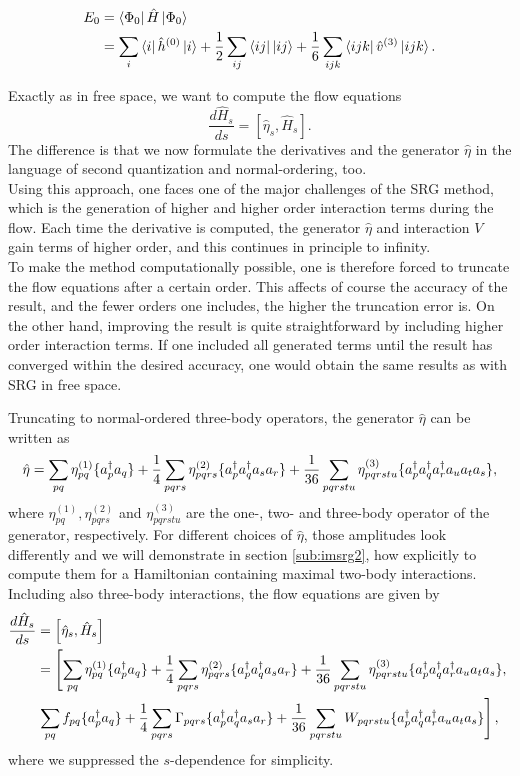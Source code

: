 \begin{align*}
E_0 &= \left\langle \Phi_0 \right| \hat{H} \left| \Phi_0 \right\rangle \\
&= \sum\limits_i \left\langle i \right| \hat{h}^{(0)} \left| i \right\rangle + \frac{1}{2}\sum\limits_{ij}\left\langle ij\right|  \left| ij\right\rangle + \frac{1}{6}\sum\limits_{ijk}\left\langle ijk \right| \hat{v}^{(3)} \left| ijk \right\rangle.
\end{align*}
			
Exactly as in free space, we want to compute the flow equations 
\[
\frac{d \hat{H}_s}{ds} = \left[\hat{\eta}_s, \hat{H}_s \right].
\]
The difference is that we now formulate the derivatives and the generator $\hat{\eta}$ in the language of second quantization and normal-ordering, too. \\
Using this approach, one faces one of the major challenges of the SRG method, which is the generation of higher and higher order interaction terms during the flow. Each time the derivative is computed, the generator $\hat{\eta}$ and interaction $V$ gain terms of higher order, and this continues in principle to infinity.\\
To make the method computationally possible, one is therefore forced to truncate the flow equations after a certain order. This affects of course the accuracy of the result, and the fewer orders one includes, the higher the truncation error is. On the other hand, improving the result is quite straightforward by including higher order interaction terms. If one included all generated terms until the result has converged within the desired accuracy, one would obtain the same results as with SRG in free space.

Truncating to normal-ordered three-body operators, the generator $\hat{\eta}$ can be written as
\[
\hat{\eta} = \sum_{pq} \eta_{pq}^{(1)} \lbrace a_p^\dagger a_q\rbrace + \frac{1}{4}\sum\limits_{pqrs}\eta_{pqrs}^{(2)} \lbrace a_p^\dagger a_q^\dagger a_s a_r \rbrace + \frac{1}{36}\sum\limits_{pqrstu} \eta_{pqrstu}^{(3)} \lbrace a_p^\dagger a_q^\dagger a_r^\dagger a_u a_t a_s\rbrace,
\]
where $\eta_{pq}^{(1)}, \eta_{pqrs}^{(2)}$ and $\eta_{pqrstu}^{(3)}$ are the one-, two- and three-body operator of the generator, respectively. For different choices of $\hat{\eta}$, those amplitudes look differently and we will demonstrate in section \ref{sub:imsrg2}, how explicitly to compute them for a Hamiltonian containing maximal two-body interactions.\\
Including also three-body interactions, the flow equations are given by
\begin{align*}
\frac{d \hat{H}_s}{ds} &= \left[\hat{\eta}_s, \hat{H}_s \right] \\
&= \left [  \sum_{pq} \eta_{pq}^{(1)} \lbrace a_p^\dagger a_q\rbrace + \frac{1}{4}\sum\limits_{pqrs}\eta_{pqrs}^{(2)} \lbrace a_p^\dagger a_q^\dagger a_s a_r \rbrace + \frac{1}{36}\sum\limits_{pqrstu} \eta_{pqrstu}^{(3)} \lbrace a_p^\dagger a_q^\dagger a_r^\dagger a_u a_t a_s\rbrace, \right.\\
& \left.\sum\limits_{pq}f_{pq}\lbrace a_p^\dagger a_q\rbrace + \frac{1}{4}\sum\limits_{pqrs}\Gamma_{pqrs} \lbrace a_p^\dagger a_q^\dagger a_s a_r \rbrace + \frac{1}{36}\sum\limits_{pqrstu} W_{pqrstu} \lbrace a_p^\dagger a_q^\dagger a_r^\dagger a_u a_t a_s\rbrace
\right],
\end{align*}
where we suppressed the $s$-dependence for simplicity.

